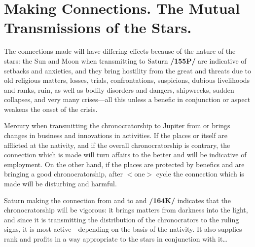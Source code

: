 \section{Making Connections. The Mutual Transmissions of the Stars.}

The connections made will have differing effects because of the nature of the stars: the Sun and Moon when transmitting to Saturn \textbf{/155P/} are indicative of setbacks and anxieties, and they bring hostility from
the great and threats due to old religious matters, losses, trials, confrontations, suspicions, dubious livelihoods and ranks, ruin, as well as bodily disorders and dangers, shipwrecks, sudden collapses, and very many crises—all this unless a benefic in conjunction or aspect weakens the onset of the crisis.

Mercury when transmitting the chronocratorship to Jupiter from \Virgo\xspace or \Gemini\xspace brings changes in business and innovations in activities. If the places or \Mercury\xspace itself are afflicted at the nativity, and if the overall chronocratorship is contrary, the connection which is made will turn affairs to the better and will be
indicative of employment. On the other hand, if the places are protected by benefics and are bringing a good chronocratorship, after $<$one$>$ cycle the connection which is made will be disturbing and harmful.

Saturn making the connection from \Capricorn\xspace and \Aquarius\xspace to \Leo\xspace and \Cancer\xspace \textbf{/164K/} indicates that the chronocratorship will be vigorous: it brings matters from darkness into the light, and since it is
transmitting the distribution of the chronocrators to the ruling signs, it is most active—depending on the basis of the nativity. It also supplies rank and profits in a way appropriate to the stars in conjunction with it\ldots

\newpage